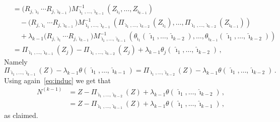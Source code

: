 \documentclass[final,numbib]{imaiai}%
\numberwithin{equation}{section}
\renewcommand{\hat}{\widehat}
\def\\bUnif{\text{\bUnif}}
\newcommand{\<}{\langle}
\renewcommand{\>}{\rangle}
\newcommand{\1}{\mathds{1}}
\begin{document}
{\begin{align*}
& = \big(R_{j,\hat \imath_1} \cdots R_{j,\hat \imath_{k-1}}  \big)M^{-1}_{\hat \imath_1,\ldots, \hat \imath_{k-1}} 
   (Z_{\hat \imath_1},\ldots,Z_{\hat \imath_{k-1}})
\\
 &\quad - \big(R_{j,\hat \imath_1} \cdots R_{j,\hat \imath_{k-1}}  \big)M^{-1}_{\hat \imath_1,\ldots, \hat \imath_{k-1}}   
	( 
  		\Pi_{\hat\imath_1,\ldots,\hat\imath_{k-2}}  (Z_{\hat \imath_1}),\ldots,\Pi_{\hat\imath_1,\ldots, \hat \imath_{k-2}}  (Z_{\hat \imath_{k-1}})  
  	)
\\
&\quad + \lambda_{k-1}\big(R_{j,\hat \imath_1} \cdots R_{j,\hat \imath_{k-1}}  \big)M^{-1}_{\hat \imath_1,\ldots, \hat \imath_{k-1}}   
( 
 \theta_{\hat \imath_1}(\,\hat \imath_1, \ldots , \hat\imath_{k-2}),\ldots,\theta_{\hat \imath_{k-1}} (\,\hat \imath_1,\ldots,\hat\imath_{k-2})  
  ) 
\\
& = \Pi_{\hat\imath_1,\ldots,\hat\imath_{k-1}}  (Z_{j})- \Pi_{\hat\imath_1,\ldots,\hat\imath_{k-2}}  (Z_j)
+\lambda_{k-1} \theta_j(\,\hat \imath_1,\ldots,\hat \imath_{k-2}) \,,
  \end{align*}
  Namely
  \[
  \Pi_{\hat \imath_1,\ldots,\hat \imath_{k-1}}  (Z)-\lambda_{k-1} \theta(\,\hat \imath_1,\ldots, \hat \imath_{k-1})
  =
  \Pi_{\hat \imath_1,\ldots,\hat \imath_{k-2}}  (Z)-\lambda_{k-1} \theta(\,\hat \imath_1,\ldots, \hat \imath_{k-2})\,.
  \]
Using again~\eqref{eq:induc} we get that
\begin{align*}
 N^{(k-1)}&= Z  - \Pi_{\hat \imath_1,\ldots,\hat \imath_{k-2}}  (Z)+\lambda_{k-1} \theta(\,\hat \imath_1,\ldots, \hat \imath_{k-2})\,,\\
 &=Z  - \Pi_{\hat \imath_1,\ldots,\hat \imath_{k-1}}  (Z)+\lambda_{k-1} \theta(\,\hat \imath_1,\ldots, \hat \imath_{k-1})\,,
\end{align*}
as claimed.

}
\end{document}
